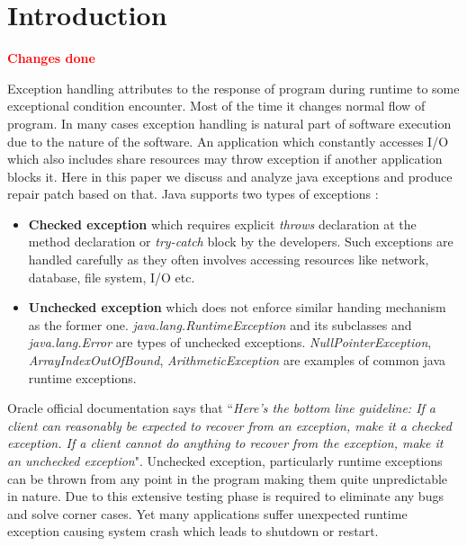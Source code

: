 \section{Introduction}
\label{sec:intro}

\textcolor{red}{\textbf{Changes done}}\newline

Exception handling attributes to the response of program during runtime to some
exceptional condition encounter.
Most of the time it changes normal flow of program. In many cases exception
handling is natural part of software execution due to the nature of the
software.
An application which constantly accesses I/O which also includes share resources
may throw exception if another application blocks it.
Here in this paper we discuss and analyze java exceptions and produce repair
patch based on that. Java supports two types of exceptions :
\begin{itemize}
	
\item \textbf{Checked exception} which requires explicit \emph{throws}
declaration at the method declaration or \emph{try-catch} block by the
developers. Such exceptions are handled carefully as they often involves
accessing resources like network, database, file system, I/O etc.
	
\item \textbf{Unchecked exception} which does not enforce similar handing
mechanism as the former one. \emph{java.lang.RuntimeException} and its
subclasses and \emph{java.lang.Error} are types of unchecked exceptions.
\emph{NullPointerException}, \emph{ArrayIndexOutOfBound},
\emph{ArithmeticException} are examples of common java runtime exceptions.

\end{itemize}

Oracle official documentation says that ``\emph{Here's the bottom line
guideline: If a client can reasonably be expected to recover from an exception,
 make it a checked exception. If a client cannot do anything to recover from the
 exception, make it an unchecked exception}".
 Unchecked exception, particularly runtime exceptions can be thrown from any
 point in the program making them quite unpredictable in nature.
 Due to this extensive testing phase is required to eliminate any bugs and solve
 corner cases.
 Yet many applications suffer unexpected runtime exception causing system crash
 which leads to shutdown or restart.

